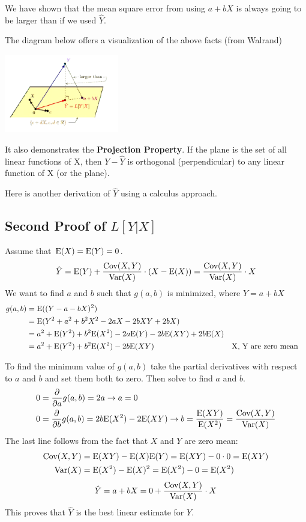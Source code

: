 \documentclass{exam}
\begin{document}
We have shown that the mean square error from using $a + bX$ is always going to be larger than if we used $\hat{Y}$.

\clearpage

The diagram below offers a visualization of the above facts (from Walrand)
\begin{center}
\includegraphics[width=5cm]{llse_projection.jpg}
\end{center}
It also demonstrates the \textbf{Projection Property}. If the plane is the set of all linear functions of X, then $Y - \hat{Y}$ is orthogonal (perpendicular) to any linear function of X (or the plane).

Here is another derivation of  $\hat{Y}$ using a calculus approach.

\subsection{Second Proof of $L[Y | X]$}

Assume that $\text{E}(X) = \text{E}(Y)  = 0$.  
\[\hat{Y} = \text{E}(Y) + \frac{\text{Cov}(X, Y)}{\text{Var}(X)} \cdot (X - \text{E}(X)) =   \frac{\text{Cov}(X, Y)}{\text{Var}(X)} \cdot X\]
We want to find $a$ and $b$ such that $g(a, b)$ is minimized, where $\hat{Y} = a + bX$
\begin{align*}
g(a, b) &= \text{E}((Y - a - bX)^2)\\
&= \text{E}(Y^2 + a^2 + b^2 X^2 - 2aX - 2bXY + 2bX)\\
&= a^2 + \text{E}(Y^2) + b^2\text{E}(X^2) - 2a\text{E}(Y) - 2b\text{E}(XY) + 2b\text{E}(X)\\
&= a^2 + \text{E}(Y^2) + b^2\text{E}(X^2) - 2b\text{E}(XY) && \text{X, Y are zero mean}
\end{align*}

To find the minimum value of $g(a, b)$ take the partial derivatives with respect to $a$ and $b$ and set them both to zero. Then solve to find $a$ and $b$.
\begin{align*}
0 &= \frac{\partial }{\partial a} g(a, b) = 2a \rightarrow a = 0\\
0 &= \frac{\partial }{\partial b} g(a, b) = 2b \text{E}(X^2) - 2\text{E}(XY) \rightarrow b = \frac{\text{E}(XY)}{\text{E}(X^2)} = \frac{\text{Cov}(X, Y)}{\text{Var}(X)}
\end{align*}
The last line follows from the fact that $X$ and $Y$ are zero mean:
\begin{align*}
\text{Cov}(X, Y) &= \text{E}(XY) - \text{E}(X)\text{E}(Y) = \text{E}(XY) - 0 \cdot 0 = \text{E}(XY)\\
\text{Var}(X) &= \text{E}(X^2) - \text{E}(X)^2 = \text{E}(X^2) - 0 = \text{E}(X^2)
\end{align*}
\[\hat{Y} = a + bX = 0 + \frac{\text{Cov}(X, Y)}{\text{Var}(X)} \cdot X \]
This proves that $\hat{Y}$ is the best linear estimate for $Y$.
\end{document}
